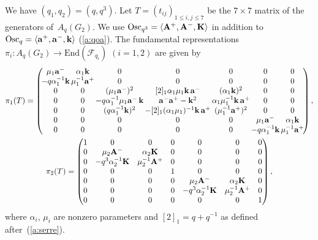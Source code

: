 \documentclass[11pt]{article}
\begin{document}
We have $(q_1,q_2)=(q,q^3)$.
Let $T=(t_{ij})_{1\le i,j \le 7}$ be the
$7\times 7$ matrix of the generators of~$A_q(G_2)$.
We  use
$\mathrm{Osc}_{q^3} =
\langle  {\rm{\bf A}}^+, {\rm{\bf A}}^-, {\rm{\bf K}} \rangle$
in addition to
$\mathrm{Osc}_q =
\langle  {\rm{\bf a}}^+, {\rm{\bf a}}^-, {\rm{\bf k}} \rangle$
(\ref{a:qoa}).
The fundamental representations
$\pi_i: A_q(G_2) \rightarrow \mathrm{End}(\mathcal{F}_{q_i})$
$(i=1,2)$ are given by{\samepage
\begin{gather}
 \pi_1(T)=
 \left(\!
\begin{array}{@{}c@{\,}c@{\,}c@{\,}c@{\,}c@{\,}c@{\,}c@{}}
\mu_1 {\rm{\bf a}}^- & \alpha_1 {\rm{\bf k}} &  0 & 0 & 0 & 0 &0 \\
-q\alpha^{-1}_1{\rm{\bf k}} & \mu^{-1}_1{\rm{\bf a}}^+ & 0 & 0&0 & 0& 0\\
0&0 & (\mu_1{\rm{\bf a}}^-)^2 &
[2]_1\alpha_1\mu_1 {\rm{\bf k}}\, {\rm{\bf a}}^- & (\alpha_1{\rm{\bf k}})^2 & 0& 0\\
0 & 0& -q\alpha_1^{-1}\mu_1{\rm{\bf a}}^- \,{\rm{\bf k}} &
{\rm{\bf a}}^- {\rm{\bf a}}^+ - {\rm{\bf k}}^2 & \alpha_1\mu^{-1}_1{\rm{\bf k}}
\,{\rm{\bf a}}^+ & 0& 0\\
0& 0& (q\alpha_1^{-1}{\rm{\bf k}})^2 &
-[2]_1(\alpha_1\mu_1)^{-1} {\rm{\bf k}}
\,{\rm{\bf a}}^+ & (\mu_1^{-1}{\rm{\bf a}}^+)^2 & 0& 0\\
0&0&0&0&0& \mu_1{\rm{\bf a}}^- & \alpha_1{\rm{\bf k}} \\
0&0&0&0&0& -q\alpha_1^{-1}{\rm{\bf k}} & \mu_1^{-1}{\rm{\bf a}}^+
 \end{array}
\!\right)
 , \nonumber\\
\pi_2(T)=
\begin{pmatrix}
1&  0&  0& 0& 0& 0&0\\
 0& \mu_2{\rm{\bf A}}^- & \alpha_2 {\rm{\bf K}} &0 &0 &0 &0 \\
 0& -q^3\alpha_2^{-1} {\rm{\bf K}} & \mu_2^{-1} {\rm{\bf A}}^+ & 0& 0& 0&0\\
0 &0 & 0& 1& 0&0 &0\\
 0& 0& 0& 0& \mu_2 {\rm{\bf A}}^- & \alpha_2 {\rm{\bf K}} & 0\\
0 & 0& 0& 0& -q^3\alpha^{-1}_2 {\rm{\bf K}} & \mu_2^{-1} {\rm{\bf A}}^+ & 0\\
 0&0&0&0&0&0& 1
 \end{pmatrix},\label{a:piTg}
\end{gather}
where $\alpha_i$, $\mu_i$ are nonzero parameters
and $[2]_1=q+q^{-1}$ as def\/ined after~(\ref{a:serre}).}
\end{document}
